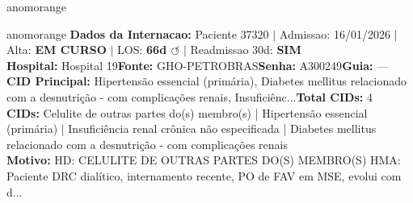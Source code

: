 \documentclass[a4paper,10pt]{article}
\begin{document}
\begin{anomalycard}[Internacao 167502 | GHO-PETROBRAS | ALTO (z=3.36)]{anomorange}

\end{anomalycard}

\newpage

\begin{anomalycard}[Internacao 162172 | GHO-PETROBRAS | ALTO (z=3.30)]{anomorange}
\textbf{Dados da Internacao:} Paciente 37320 $\mid$ Admissao: 16/01/2026 $\mid$ Alta: \textcolor{anomorange}{\textbf{EM CURSO}} $\mid$ LOS: \textbf{66d \textcolor{anomorange}{$\circlearrowleft$}} $\mid$ Readmissao 30d: \textcolor{anomred}{\textbf{SIM}}\\
\textbf{Hospital:} Hospital 19\quad\textbf{Fonte:} GHO-PETROBRAS\quad\textbf{Senha:} A300249\quad\textbf{Guia:} ---\\
\textbf{CID Principal:} {\small Hipertensão essencial (primária), Diabetes mellitus relacionado com a desnutrição - com complicações renais, Insuficiênc...}\quad\textbf{Total CIDs:} 4\\

\textbf{CIDs:} {\scriptsize Celulite de outras partes do(s) membro(s) | Hipertensão essencial (primária) | Insuficiência renal crônica não especificada | Diabetes mellitus relacionado com a desnutrição - com complicações renais}\\

\textbf{Motivo:} {\scriptsize HD: CELULITE DE OUTRAS PARTES DO(S) MEMBRO(S)  HMA: Paciente DRC dialítico, internamento recente, PO de FAV em MSE, evolui com d...}\\


\end{anomalycard}
\end{document}
